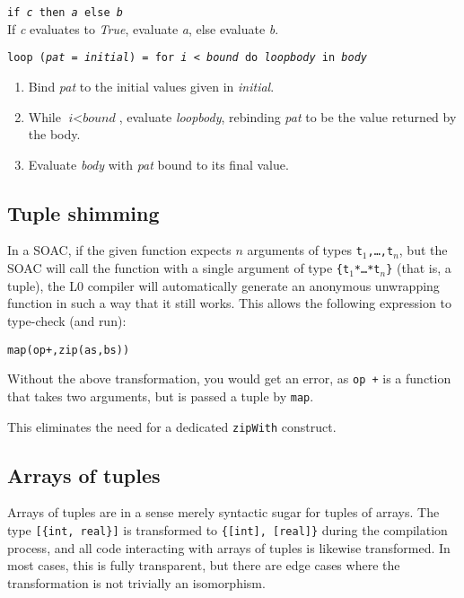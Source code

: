 \documentclass[oneside]{memoir}
\begin{document}
\begin{description}
  \item{\texttt{if \textit{c} then \textit{a} else \textit{b}}}\hfill\\
    If \textit{c} evaluates to \textit{True}, evaluate \textit{a},
    else evaluate \textit{b}.

  \item{\texttt{loop (\textit{pat} = \textit{initial}) = for \textit{i} < \textit{bound} do \textit{loopbody} in \textit{body}}}
    \begin{enumerate}
    \item Bind \textit{pat} to the initial values given in \textit{initial}.
    \item While $\textit{i} < \textit{bound}$, evaluate \textit{loopbody},
      rebinding \textit{pat} to be the value returned by the body.
    \item Evaluate \textit{body} with \textit{pat} bound to its final
      value.
    \end{enumerate}

\end{description}

\subsection{Tuple shimming}

In a SOAC, if the given function expects $n$ arguments of types
\texttt{t$_{1}$,\ldots,{}t$_{n}$}, but the SOAC will call the function
with a single argument of type \texttt{\{t$_{1}$*\ldots{}*t$_{n}$\}}
(that is, a tuple), the L0 compiler will automatically generate an
anonymous unwrapping function in such a way that it still works.  This
allows the following expression to type-check (and run):

\begin{alltt}
  map(op +, zip(as, bs))
\end{alltt}

Without the above transformation, you would get an error, as
\texttt{op +} is a function that takes two arguments, but is passed a
tuple by \texttt{map}.

This eliminates the need for a dedicated \texttt{zipWith} construct.

\subsection{Arrays of tuples}

Arrays of tuples are in a sense merely syntactic sugar for tuples of
arrays.  The type \texttt{[\{int, real\}]} is transformed to
\texttt{\{[int], [real]\}} during the compilation process, and all code
interacting with arrays of tuples is likewise transformed.  In most
cases, this is fully transparent, but there are edge cases where the
transformation is not trivially an isomorphism.
\end{document}

